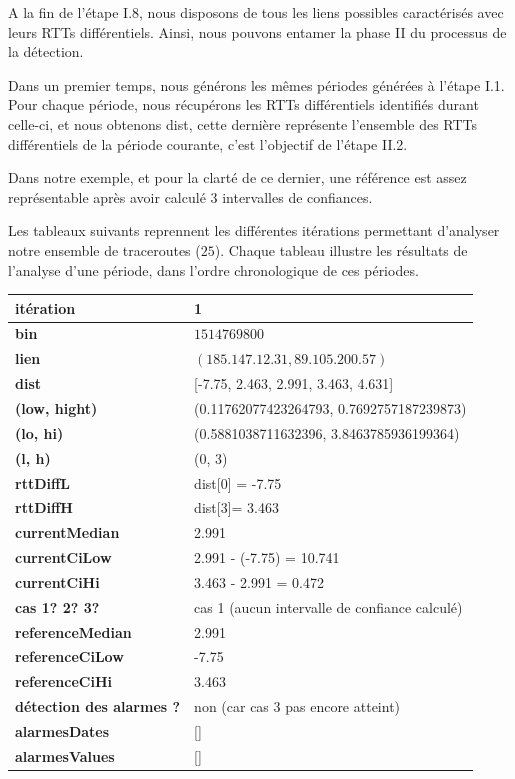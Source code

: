 A la fin de l'étape I.8, nous disposons de tous les liens possibles caractérisés avec leurs RTTs différentiels. Ainsi, nous pouvons entamer la phase II du processus de la détection.

Dans un premier temps, nous générons les mêmes  périodes générées à  l'étape I.1. Pour chaque période,  nous récupérons les RTTs différentiels identifiés durant celle-ci, et nous obtenons {\color{gray} dist}, cette dernière représente l'ensemble des RTTs différentiels de la période courante, c'est l'objectif de l'étape II.2.

Dans notre exemple,  et pour la clarté de ce dernier, une référence est assez représentable après avoir calculé 3 intervalles de confiances.  

Les tableaux suivants reprennent les différentes itérations permettant d'analyser notre ensemble de traceroutes ($25$). Chaque tableau illustre les résultats de l'analyse d'une période, dans l'ordre chronologique de ces périodes.
\newpage
\begin{table}[H]
	\centering
	
	\begin{tabularx}{\linewidth}{|l|X| }
		\hline
		\textbf{itération} & 1	\\ \hline
		\textbf{bin} & $1514769800$ \\ \hline
		\textbf{lien} & $(185.147.12.31, 89.105.200.57)$  \\ \hline
		\textbf{dist}& [-7.75, 2.463, 2.991, 3.463, 4.631]	\\ \hline
		\textbf{(low, hight)}& (0.11762077423264793, 0.7692757187239873) 	\\ \hline
		\textbf{(lo, hi)}&(0.5881038711632396, 3.8463785936199364)  \\ \hline
		\textbf{(l, h)} & (0, 3) 	\\ \hline
		\textbf{rttDiffL}& dist[0] = -7.75	\\ \hline
		\textbf{rttDiffH}& dist[3]= 3.463	\\ \hline
		\textbf{currentMedian}& 2.991	\\ \hline
		\textbf{currentCiLow}&  2.991 - (-7.75) = 10.741 	\\ \hline
		\textbf{currentCiHi}& 3.463 - 2.991 =  0.472	\\ \hline
		\textbf{cas 1? 2? 3?}& cas 1 (aucun intervalle de confiance calculé)  \\ \hline
		\textbf{referenceMedian}& 2.991	\\ \hline
		\textbf{referenceCiLow}& -7.75	\\ \hline
		\textbf{referenceCiHi}&3.463	\\ \hline
		\textbf{détection des alarmes ?}& non (car cas 3 pas  encore atteint)	\\ \hline
		\textbf{alarmesDates}& []	\\ \hline
		\textbf{alarmesValues}& []	\\ \hline
		
		
	\end{tabularx}
\end{table}


